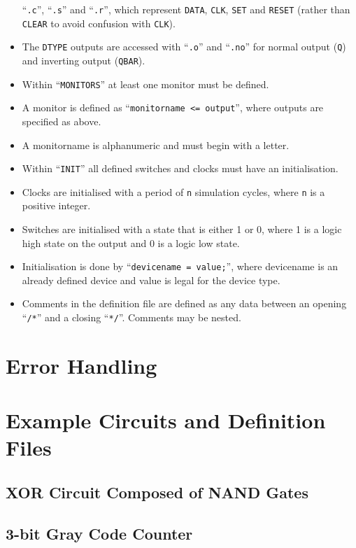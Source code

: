 \documentclass[a4paper,11pt]{article}  %
\begin{document}
\begin{itemize}
    ``\texttt{.c}'', ``\texttt{.s}'' and ``\texttt{.r}'', which
    represent \texttt{DATA}, \texttt{CLK}, \texttt{SET} and
    \texttt{RESET} (rather than \texttt{CLEAR} to avoid confusion with
    \texttt{CLK}).
  \item The \texttt{DTYPE} outputs are accessed with ``\texttt{.o}''
    and ``\texttt{.no}'' for normal output (\texttt{Q}) and inverting
    output (\texttt{QBAR}).
  \item Within ``\texttt{MONITORS}'' at least one monitor must be
    defined.
  \item A monitor is defined as ``\texttt{monitorname <= output}'',
    where outputs are specified as above.
  \item A monitorname is alphanumeric and must begin with a letter.
  \item Within ``\texttt{INIT}'' all defined switches and clocks must
    have an initialisation.
  \item Clocks are initialised with a period of \texttt{n} simulation
    cycles, where \texttt{n} is a positive integer.
  \item Switches are initialised with a state that is either 1 or 0,
    where 1 is a logic high state on the output and 0 is a logic low
    state.
  \item Initialisation is done by ``\texttt{devicename = value;}'', where
    devicename is an already defined device and value is legal for the
    device type.
  \item Comments in the definition file are defined as any data
    between an opening ``\texttt{/*}'' and a closing ``\texttt{*/}''. Comments may be
    nested.
\end{itemize}

\section{Error Handling}

\section{Example Circuits and Definition Files}

\subsection{XOR Circuit Composed of NAND Gates}

\subsection{3-bit Gray Code Counter}
\end{document}
